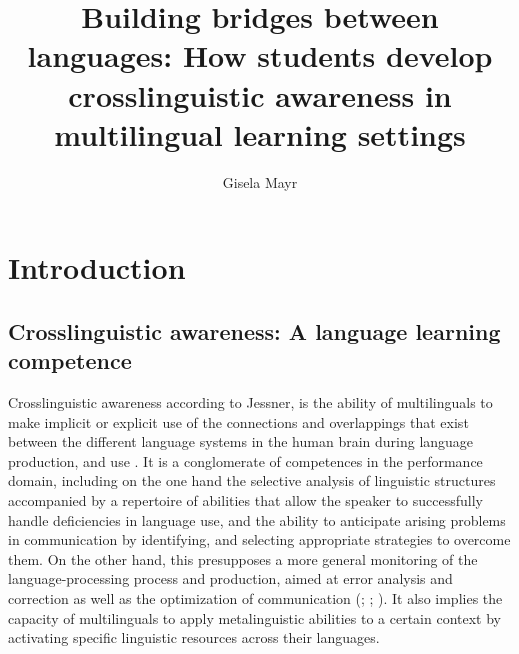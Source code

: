 \documentclass[output=paper]{../langscibook}
\author{Gisela Mayr\affiliation{Free University of Bolzano}\orcid{}}
\title{Building bridges between languages: How students develop crosslinguistic awareness in multilingual learning settings}
\begin{document}
\maketitle 
{}%




\section{Introduction}

\subsection{Crosslinguistic awareness: A language learning competence}

Crosslinguistic awareness according to Jessner, is the ability of multilinguals to make implicit or explicit use of the connections and overlappings that exist between the different language systems in the human brain during language production, and use \citep[116]{Jessner2006}. It is a conglomerate of competences in the performance domain, including on the one hand the selective analysis of linguistic structures accompanied by a repertoire of abilities that allow the speaker to successfully handle deficiencies in language use, and the ability to anticipate arising problems in communication by identifying, and selecting appropriate strategies to overcome them. On the other hand, this presupposes a more general monitoring of the language-processing process and production, aimed at error analysis and correction as well as the optimization of communication (\citealt{LuoEtAl2010}; \citealt{DeAngelisDewaele2011}; \citealt{HerdinaJessner2002b}). It also implies the capacity of multilinguals to apply metalinguistic abilities to a certain context by activating specific linguistic resources across their languages. 
\end{document}
